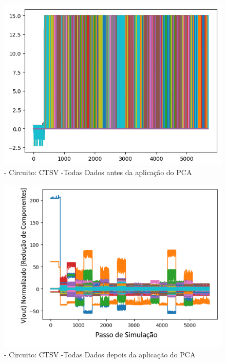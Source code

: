         \begin{figure}[H]
        \begin{center}
        \includegraphics[width=13cm]{./01_Pre_textuais/ctsv_figs/PAA_CTSV_mc_+_4bitPRBS_[FALHA]raw.png}
        \caption{\label{fig:paaSalenkey}- Circuito: CTSV -Todas Dados antes da aplicação do PCA}
        \end{center}
        \end{figure}
        
        
        \begin{figure}[H]
        \begin{center}
        \includegraphics[width=13cm]{./01_Pre_textuais/ctsv_figs/PCA_CTSV_mc_+_4bitPRBS_[FALHA]raw.png}
        \caption{\label{fig:pcaSalenkey}- Circuito: CTSV  -Todas Dados depois da aplicação do PCA}
        \end{center}
        \end{figure}
        
